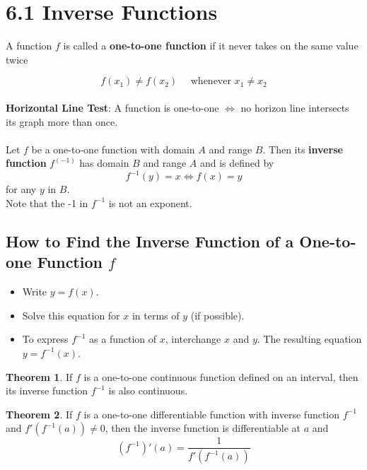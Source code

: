 %
%

\section*{6.1 Inverse Functions}

\theoremstyle{definition}
\newtheorem*{definition}{Theorem}

A function \(f\) is called a \textbf{one-to-one function} if it never takes on the same value twice

\[ f(x_1) \neq f(x_2) \quad \text{ whenever } x_1 \neq x_2 \]
\\
\textbf{Horizontal Line Test}: A function is one-to-one \( \Longleftrightarrow \) no horizon line intersects its graph more than once.
\\\\
Let \(f\) be a one-to-one function with domain \(A\) and range \(B\). Then its \textbf{inverse function} \(f^(-1)\) has domain \(B\) and range \(A\) and is defined by
\[ f^{-1}(y)=x \Leftrightarrow f(x)=y \]
for any \(y\) in \(B\).
\\
Note that the -1 in \(f^{-1}\) is not an exponent.

\subsection*{How to Find the Inverse Function of a One-to-one Function \(f\)}

\begin{itemize}
  \item Write \( y=f(x) \).
  \item Solve this equation for \(x\) in terms of \(y\) (if possible).
  \item To express \(f^{-1}\) as a function of \(x\), interchange \(x\) and \(y\). The resulting equation \(y=f^{-1}(x)\).
\end{itemize}

\begin{definition}
If \(f\) is a one-to-one continuous function defined on an interval, then its inverse function \(f^{-1}\) is also continuous.
\end{definition}

\begin{definition}
If \(f\) is a one-to-one differentiable function with inverse function \( f^{-1}\) and \(f'(f^{-1}(a)) \neq 0 \), then the inverse function is differentiable at \(a\) and 
\[ (f^{-1})'(a) = \frac{1}{f'(f^{-1}(a))} \]
\end{definition}
